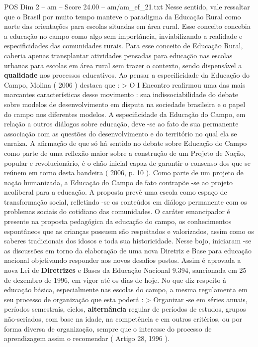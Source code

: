 \begin{textsample}{POS Dim 2 – am – Score 24.00 – am/am\_ef\_21.txt}
Nesse sentido, vale ressaltar que o Brasil por muito tempo manteve o paradigma da Educação Rural como norte das orientações para escolas situadas em área rural.
Esse conceito concebia a educação no campo como algo sem importância, inviabilizando a realidade e especificidades das comunidades rurais.
Para esse conceito de Educação Rural, caberia apenas transplantar atividades pensadas para educação nas escolas urbanas para escolas em área rural sem trazer o contexto, sendo dispensável a \textbf{qualidade} nos processos educativos.
Ao pensar a especificidade da Educação do Campo, Molina ( 2006 ) destaca que : > O I Encontro reafirmou uma das mais marcantes características desse movimento : sua indissociabilidade do debate sobre modelos de desenvolvimento em disputa na sociedade brasileira e o papel do campo nos diferentes modelos.
A especificidade da Educação do Campo, em relação a outros diálogos sobre educação, deve -se ao fato de sua permanente associação com as questões do desenvolvimento e do território no qual ela se enraiza.
A afirmação de que só há sentido no debate sobre Educação do Campo como parte de uma reflexão maior sobre a construção de um Projeto de Nação, popular e revolucionário, é o chão inicial capaz de garantir o consenso dos que se reúnem em torno desta bandeira ( 2006, p. 10 ).
Como parte de um projeto de nação humanizada, a Educação do Campo de fato contrapõe -se ao projeto neoliberal para a educação.
A proposta prevê uma escola como espaço de transformação social, refletindo -se os conteúdos em diálogo permanente com os problemas sociais do cotidiano das comunidades.
O caráter emancipador é presente na proposta pedagógica da educação do campo, os conhecimentos espontâneos que as crianças possuem são respeitados e valorizados, assim como os saberes tradicionais dos idosos e toda sua historicidade.
Nesse bojo, iniciaram -se as discussões em torno da elaboração de uma nova Diretriz e Base para educação nacional objetivando responder aos novos desafios postos.
Assim é aprovada a nova Lei de \textbf{Diretrizes} e Bases da Educação Nacional 9.394, sancionada em 25 de dezembro de 1996, em vigor até os dias de hoje.
No que diz respeito à educação básica, especialmente nas escolas do campo, a mesma regulamenta em seu processo de organização que esta poderá : > Organizar -se em séries anuais, períodos semestrais, ciclos, \textbf{alternância} regular de períodos de estudos, grupos não-seriados, com base na idade, na competência e em outros critérios, ou por forma diversa de organização, sempre que o interesse do processo de aprendizagem assim o recomendar ( Artigo 28, 1996 ).

\end{textsample}

